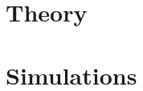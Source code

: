 \documentclass[a4paper,twoside]{book}
\begin{document}


\chapter{Theory}


\chapter{Simulations}



\end{document}
